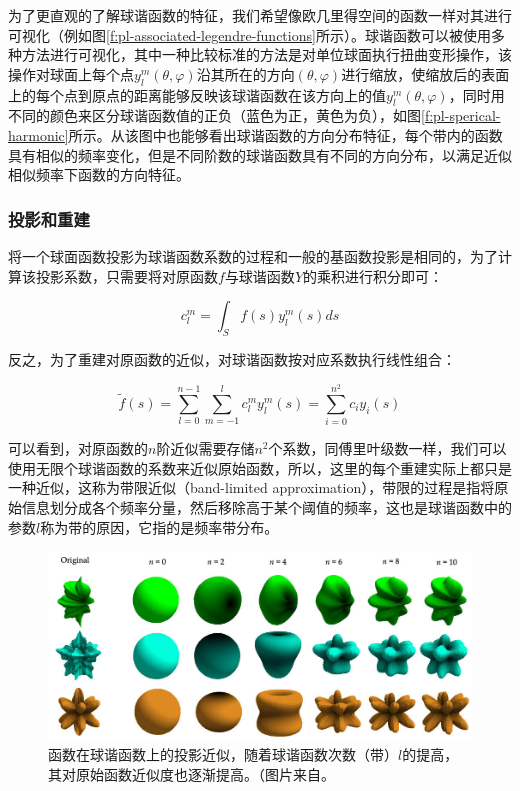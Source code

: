 为了更直观的了解球谐函数的特征，我们希望像欧几里得空间的函数一样对其进行可视化（例如图\ref{f:pl-associated-legendre-functions}所示）。球谐函数可以被使用多种方法进行可视化，其中一种比较标准的方法是对单位球面执行扭曲变形操作，该操作对球面上每个点$y^{m}_l(\theta,\varphi)$沿其所在的方向$(\theta,\varphi)$进行缩放，使缩放后的表面上的每个点到原点的距离能够反映该球谐函数在该方向上的值$y^{m}_l(\theta,\varphi)$，同时用不同的颜色来区分球谐函数值的正负（蓝色为正，黄色为负），如图\ref{f:pl-sperical-harmonic}所示。从该图中也能够看出球谐函数的方向分布特征，每个带内的函数具有相似的频率变化，但是不同阶数的球谐函数具有不同的方向分布，以满足近似相似频率下函数的方向特征。




\subsubsection{投影和重建}
将一个球面函数投影为球谐函数系数的过程和一般的基函数投影是相同的，为了计算该投影系数，只需要将对原函数$f$与球谐函数$Y$的乘积进行积分即可：

\begin{equation}
	c_{l}^{m}=\int_{S}f(s)y^{m}_{l}(s)ds
\end{equation}

反之，为了重建对原函数的近似，对球谐函数按对应系数执行线性组合：

\begin{equation}
	\tilde{f}(s)=\sum^{n-1}_{l=0}\sum^{l}_{m=-1}c^{m}_{l}y^{m}_{l}(s)=\sum^{n^{2}}_{i=0}c_iy_i(s)
\end{equation}

可以看到，对原函数的$n$阶近似需要存储$n^{2}$个系数，同傅里叶级数一样，我们可以使用无限个球谐函数的系数来近似原始函数，所以，这里的每个重建实际上都只是一种近似，这称为带限近似（band-limited approximation），带限的过程是指将原始信息划分成各个频率分量，然后移除高于某个阈值的频率，这也是球谐函数中的参数$l$称为带的原因，它指的是频率带分布。

\begin{figure}
\begin{fullwidth}
	\includegraphics[width=1.0\thewidth]{graphics/prt/prt-6-2}
	\caption{函数在球谐函数上的投影近似，随着球谐函数次数（带）$l$的提高，其对原始函数近似度也逐渐提高。（图片来自\cite{a:SphericalHarmonicLightingTheGrittyDetails}。}
	\label{f:pl-band-limited-approximation}
\end{fullwidth}
\end{figure}

